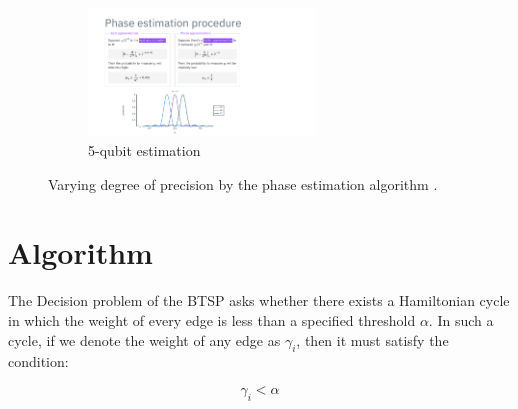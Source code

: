 \documentclass[msc,oneside]{ubcthesis}
\begin{document}
\begin{figure}[ht]
	\vspace{1ex} %
	
	\begin{subfigure}[b]{\linewidth}
		\centering
		\includegraphics[height=3.4cm, trim={2.4cm 0.15cm 6.4cm 5.95cm}, clip]{phase-lecture/29_Phase-estimation-lecture-slides}
		\caption{5-qubit estimation}
		\label{fig:image4}
	\end{subfigure}
	
	\caption{Varying degree of precision by the phase estimation algorithm \cite{Phase-estimation}.}
	\label{fig:phase-precision}
\end{figure}
	
	\chapter{Algorithm}
	
The Decision problem of the BTSP asks whether there exists a Hamiltonian cycle in which the weight of every edge is less than a specified threshold $\alpha$. In such a cycle, if we denote the weight of any edge as $\gamma_i$, then it must satisfy the condition:
	 
	 $$\gamma_i < \alpha$$
	
\end{document}
